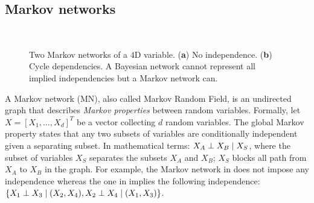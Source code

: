\subsection{Markov networks}
\begin{figure}
    \centering
    \begin{subfigure}{.45\textwidth}
        \centering
        \caption{}\label{fig:MN-fig-a}
    \end{subfigure}~\hspace{-4.8em}
    \begin{subfigure}{.45\textwidth}
    \centering
        \caption{}\label{fig:MN-fig-b}
    \end{subfigure}
    \caption{Two Markov networks of a $4$D variable. (\textbf{a}) No independence. (\textbf{b}) Cycle dependencies. A Bayesian network cannot represent all implied independencies but a Markov network can.} \label{fig:MN-fig}
\end{figure}
A Markov network (MN), also called Markov Random Field, is an undirected graph that describes \textit{Markov properties} between random variables. Formally, let $X = \left[X_1, \hdots, X_d\right]^T$ be a vector collecting $d$ random variables. The global Markov property states that any two subsets of variables are conditionally independent given a separating subset. In mathematical terms: $X_A \perp X_B \mid X_S$, where the subset of variables $X_S$ separates the subsets $X_A$ and $X_B$; $X_S$ blocks all path from $X_A$ to $X_B$ in the graph. For example, the Markov network in  does not impose any independence whereas the one in  implies the following independence: $\{ X_1 \perp X_3 \mid (X_2, X_4), X_2 \perp X_4 \mid (X_1, X_3)\}$.

